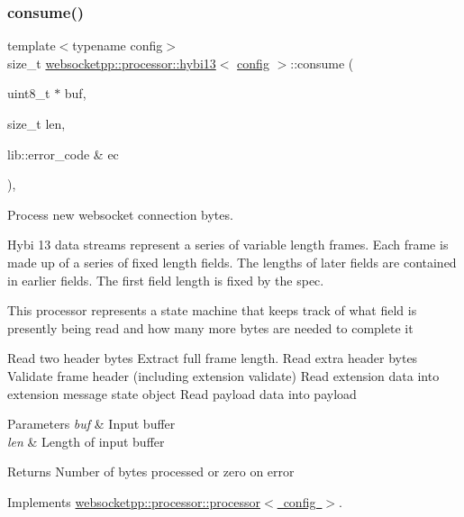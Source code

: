 \subsubsection{\texorpdfstring{consume()}{consume()}}
{\footnotesize\ttfamily template$<$typename config$>$ \\
size\+\_\+t \mbox{\hyperlink{classwebsocketpp_1_1processor_1_1hybi13}{websocketpp\+::processor\+::hybi13}}$<$ \mbox{\hyperlink{classconfig}{config}} $>$\+::consume (\begin{DoxyParamCaption}\item[{uint8\+\_\+t $\ast$}]{buf,  }\item[{size\+\_\+t}]{len,  }\item[{lib\+::error\+\_\+code \&}]{ec }\end{DoxyParamCaption})\hspace{0.3cm}{\ttfamily [inline]}, {\ttfamily [virtual]}}



Process new websocket connection bytes. 

Hybi 13 data streams represent a series of variable length frames. Each frame is made up of a series of fixed length fields. The lengths of later fields are contained in earlier fields. The first field length is fixed by the spec.

This processor represents a state machine that keeps track of what field is presently being read and how many more bytes are needed to complete it

Read two header bytes Extract full frame length. Read extra header bytes Validate frame header (including extension validate) Read extension data into extension message state object Read payload data into payload


\begin{DoxyParams}{Parameters}
{\em buf} & Input buffer\\
\hline
{\em len} & Length of input buffer\\
\hline
\end{DoxyParams}
\begin{DoxyReturn}{Returns}
Number of bytes processed or zero on error 
\end{DoxyReturn}


Implements \mbox{\hyperlink{classwebsocketpp_1_1processor_1_1processor_a14cb7ee9cd5fa60353ba198f1d3d06c5}{websocketpp\+::processor\+::processor$<$ config $>$}}.

\mbox{\label{classwebsocketpp_1_1processor_1_1hybi13_a3d3b0e51df97cd7c8dcde00fb3003a34}} 
